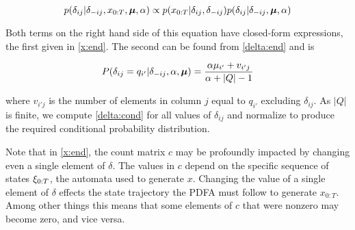 \begin{equation}
p(\delta_{ij}|\delta_{-ij},x_{0:T},\bmu,\alpha) \propto p(x_{0:T}|\delta_{ij},\delta_{-ij})p(\delta_{ij}|\delta_{-ij},\bmu,\alpha) \label{delta:cond}
\end{equation}

Both terms on the right hand side of this equation have closed-form expressions, the first given in \eqref{x:end}.  The second can be found from \eqref{delta:end} and is

\begin{equation}
P(\delta_{ij} = q_{i'}|\delta_{-ij},\alpha,\bmu) = \frac{\alpha\mu_{i'} + v_{i'j}}{\alpha + |Q| - 1} \label{delta:pred}
\end{equation}

where $v_{i'j}$ is the number of elements in column $j$ equal to $q_{i'}$  excluding $\delta_{ij}$.  As $|Q|$ is finite, we compute \eqref{delta:cond} for all values of $\delta_{ij}$ and normalize to produce the required conditional probability distribution.

Note that in \eqref{x:end}, the count matrix $c$ may be profoundly impacted by changing even a single element of $\delta$.  The values in $c$ depend on the specific sequence of states  $\q_{0:T}$, the automata used to generate $x$.  Changing the value of a single element of $\delta$ effects the state trajectory the PDFA must follow to generate $x_{0:T}$.  %
 Among other things this means that some elements of $c$ that were nonzero may become zero, and vice versa.

